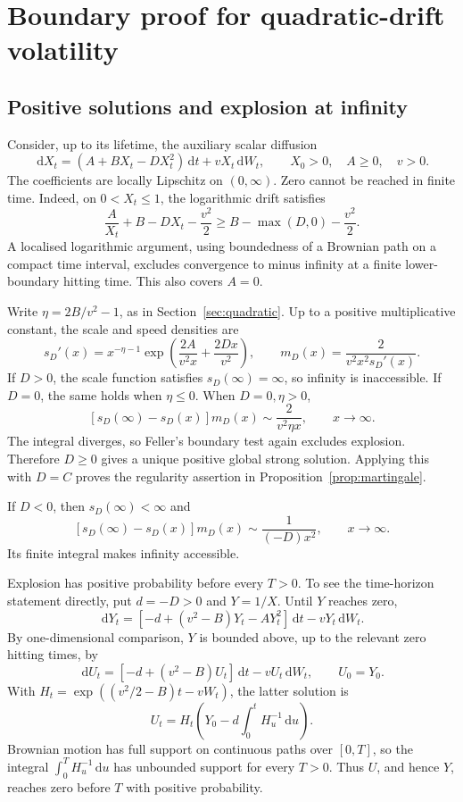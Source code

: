 \documentclass[11pt,a4paper]{article}
\theoremstyle{definition}
\theoremstyle{remark}
\newcommand{\dd}{\,\mathrm{d}}
\begin{document}
\appendix
\section{Boundary proof for quadratic-drift volatility}
\label{app:proof}

\subsection{Positive solutions and explosion at infinity}

Consider, up to its lifetime, the auxiliary scalar diffusion
\begin{equation}
 \dd X_t=(A+BX_t-DX_t^2)\dd t+vX_t\dd W_t,\qquad
 X_0>0,\quad A\geq0,\quad v>0.
 \label{eq:auxiliary}
\end{equation}
The coefficients are locally Lipschitz on \((0,\infty)\). Zero cannot be reached in finite time. Indeed, on \(0<X_t\leq1\), the logarithmic drift satisfies
\[
 \frac{A}{X_t}+B-DX_t-\frac{v^2}{2}
 \geq B-\max(D,0)-\frac{v^2}{2}.
\]
A localised logarithmic argument, using boundedness of a Brownian path on a compact time interval, excludes convergence to minus infinity at a finite lower-boundary hitting time. This also covers \(A=0\).

Write \(\eta=2B/v^2-1\), as in Section~\ref{sec:quadratic}. Up to a positive multiplicative constant, the scale and speed densities are
\begin{equation}
 s_D'(x)=x^{-\eta-1}\exp\left(\frac{2A}{v^2x}+\frac{2Dx}{v^2}\right),
 \qquad
 m_D(x)=\frac{2}{v^2x^2s_D'(x)}.
 \label{eq:scale-speed}
\end{equation}
If \(D>0\), the scale function satisfies \(s_D(\infty)=\infty\), so infinity is inaccessible. If \(D=0\), the same holds when \(\eta\leq0\). When \(D=0,\eta>0\),
\[
 [s_D(\infty)-s_D(x)]m_D(x)
 \sim\frac{2}{v^2\eta x},\qquad x\to\infty.
\]
The integral diverges, so Feller's boundary test again excludes explosion. Therefore \(D\geq0\) gives a unique positive global strong solution. Applying this with \(D=C\) proves the regularity assertion in Proposition~\ref{prop:martingale}.

If \(D<0\), then \(s_D(\infty)<\infty\) and
\[
 [s_D(\infty)-s_D(x)]m_D(x)
 \sim\frac{1}{(-D)x^2},\qquad x\to\infty.
\]
Its finite integral makes infinity accessible.

Explosion has positive probability before every \(T>0\). To see the time-horizon statement directly, put \(d=-D>0\) and \(Y=1/X\). Until \(Y\) reaches zero,
\[
 \dd Y_t=[-d+(v^2-B)Y_t-AY_t^2]\dd t-vY_t\dd W_t.
\]
By one-dimensional comparison, \(Y\) is bounded above, up to the relevant zero hitting times, by
\[
 \dd U_t=[-d+(v^2-B)U_t]\dd t-vU_t\dd W_t,\qquad U_0=Y_0.
\]
With \(H_t=\exp((v^2/2-B)t-vW_t)\), the latter solution is
\[
 U_t=H_t\left(Y_0-d\int_0^tH_u^{-1}\dd u\right).
\]
Brownian motion has full support on continuous paths over \([0,T]\), so the integral \(\int_0^TH_u^{-1}\dd u\) has unbounded support for every \(T>0\). Thus \(U\), and hence \(Y\), reaches zero before \(T\) with positive probability.
\end{document}
